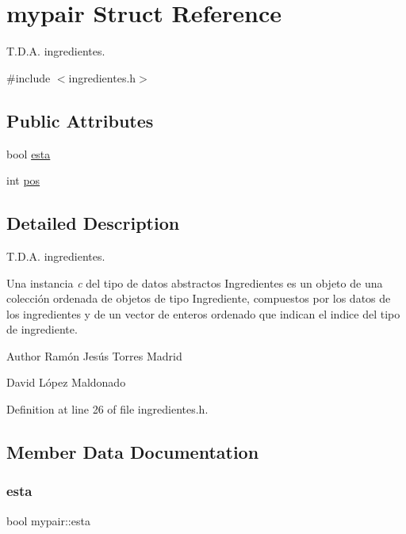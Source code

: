 \hypertarget{structmypair}{}\section{mypair Struct Reference}
\label{structmypair}


T.\+D.\+A. ingredientes.  




{\ttfamily \#include $<$ingredientes.\+h$>$}

\subsection*{Public Attributes}
\begin{DoxyCompactItemize}
\item 
bool \hyperlink{structmypair_a67eadf826beeb0527c5156298fd9f5c3}{esta}
\item 
int \hyperlink{structmypair_a3cfe391d3fe21767719a321dfac81fad}{pos}
\end{DoxyCompactItemize}


\subsection{Detailed Description}
T.\+D.\+A. ingredientes. 

Una instancia {\itshape c} del tipo de datos abstractos {\ttfamily Ingredientes} es un objeto de una colección ordenada de objetos de tipo Ingrediente, compuestos por los datos de los ingredientes y de un vector de enteros ordenado que indican el indice del tipo de ingrediente.

\begin{DoxyAuthor}{Author}
Ramón Jesús Torres Madrid 

David López Maldonado 
\end{DoxyAuthor}


Definition at line 26 of file ingredientes.\+h.



\subsection{Member Data Documentation}
\mbox{\label{structmypair_a67eadf826beeb0527c5156298fd9f5c3}} 
\subsubsection{\texorpdfstring{esta}{esta}}
{\footnotesize\ttfamily bool mypair\+::esta}

